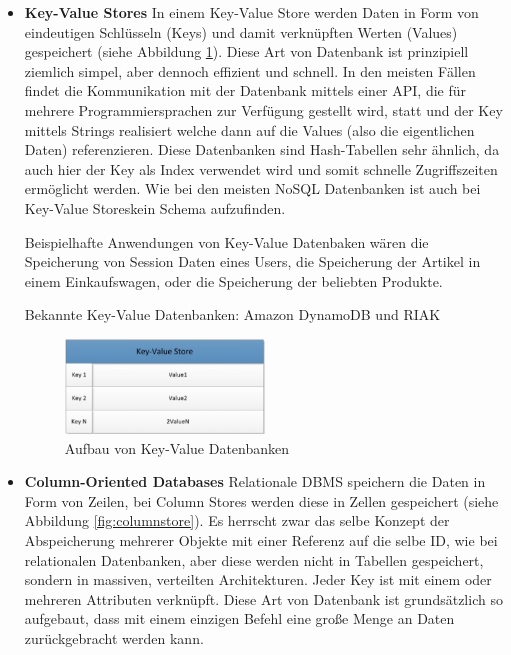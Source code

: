 \begin{itemize}
	\item \textbf{Key-Value Stores\newline}
	In einem Key-Value Store werden Daten in Form von eindeutigen Schlüsseln (Keys) und damit verknüpften Werten (Values) gespeichert (siehe Abbildung \ref{fig:keyvalue}). Diese Art von Datenbank ist prinzipiell ziemlich simpel, aber dennoch effizient und schnell. In den meisten Fällen findet die Kommunikation mit der Datenbank mittels einer API, die für mehrere Programmiersprachen zur Verfügung gestellt wird, statt und der Key mittels Strings realisiert welche dann auf die Values (also die eigentlichen Daten) referenzieren. Diese Datenbanken sind Hash-Tabellen sehr ähnlich, da auch hier der Key als Index verwendet wird und somit schnelle Zugriffszeiten ermöglicht werden. Wie bei den meisten NoSQL Datenbanken ist auch bei Key-Value Storeskein Schema aufzufinden.

	Beispielhafte Anwendungen von Key-Value Datenbaken wären die Speicherung von Session Daten eines Users, die Speicherung der Artikel in einem Einkaufswagen, oder die Speicherung der beliebten Produkte.

	Bekannte Key-Value Datenbanken: Amazon DynamoDB und RIAK\nextline

	\begin{figure}[h]\centering
		\includegraphics[width=0.5\textwidth]{images/keyvalueStore}
		\caption{Aufbau von Key-Value Datenbanken}
		\label{fig:keyvalue}
	\end{figure}

	\item \textbf{Column-Oriented Databases\newline}
	Relationale DBMS speichern die Daten in Form von Zeilen, bei Column Stores werden diese in Zellen gespeichert (siehe Abbildung \ref{fig:columnstore}). Es herrscht zwar das selbe Konzept der Abspeicherung mehrerer Objekte mit einer Referenz auf die selbe ID, wie bei relationalen Datenbanken, aber diese werden nicht in Tabellen gespeichert, sondern in massiven, verteilten Architekturen. Jeder Key ist mit einem oder mehreren Attributen verknüpft. Diese Art von Datenbank ist grundsätzlich so aufgebaut, dass mit einem einzigen Befehl eine große Menge an Daten zurückgebracht werden kann. 


\end{itemize}
